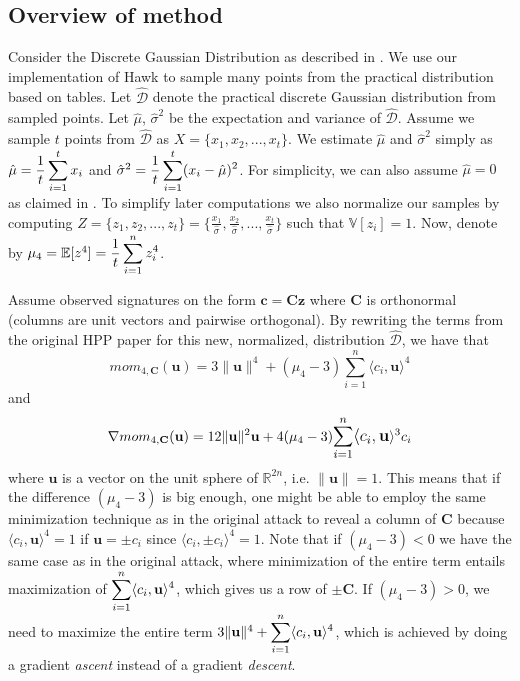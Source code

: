 \documentclass[12 pt]{article}        	%
\newcommand{\mat}[1]{\mathbf{#1}}
\renewcommand{\vec}[1]{\mathbf{#1}}
\newcommand{\bb}[1]{\mathbb{#1}}
\newcommand{\dgdi}{\widehat{\mathcal{D}}}
\begin{document}
\subsection{Overview of method}
Consider the Discrete Gaussian Distribution as described in \cite{HawkSpec24}. We use our implementation of Hawk to sample many points from the practical distribution based on tables.
Let $\dgdi$ denote the practical discrete Gaussian distribution from sampled points.
Let $\hat{\mu}$, $\hat{\sigma}^2$ be the expectation and variance of $\dgdi$.
Assume we sample $t$ points from $\dgdi$ as $X = \{x_1, x_2, ..., x_t\}$. We estimate $\hat{\mu}$ and $\hat{\sigma}^2$ simply as $\hat{\mu} = \mathlarger{\frac{1}{t} \sum_{i=1}^{t} x_i}$ and $\hat{\sigma}^2 = \mathlarger{\frac{1}{t} \sum_{i=1}^{t}(x_i - \hat{\mu})^2}$.
For simplicity, we can also assume $\hat{\mu} = 0$ as claimed in \cite{HawkSpec24}.
To simplify later computations we also normalize our samples by computing $Z = \{z_1, z_2, ..., z_t\} = \{\frac{x_1}{\hat{\sigma}}, \frac{x_2}{\hat{\sigma}},..., \frac{x_t}{\hat{\sigma}}\}$ such that 
$\bb{V}[z_i] = 1$.
Now, denote by $\mu_4 = \bb{E}[z^4] = \mathlarger{\frac{1}{t} \sum_{i=1}^{n} z_i ^4}$. 

Assume observed signatures on the form $\vec{c} = \mat{C} \vec{z}$ where $\mat{C}$ is orthonormal (columns are unit vectors and pairwise orthogonal). 
By rewriting the terms from the original HPP paper \cite{NR09} for this new, normalized, distribution $\dgdi$, we have that
\[mom_{4, \mat{C}} (\vec{u}) = 3 \lVert \vec{u} \rVert ^4 + (\mu_4 - 3) \sum_{i=1}^{n} \langle c_i, \vec{u} \rangle^4 \]
and
\[\nabla mom_{4, \mat{C}} (\vec{u}) = 12 \lVert \vec{u} \rVert^2 \vec{u} + 4(\mu_4 - 3) \mathlarger{\sum_{i=1}^{n} \langle c_i, \vec{u}} \rangle^3 c_i\]
where $\vec{u}$ is a vector on the unit sphere of $\bb{R}^{2n}$, i.e. $\lVert \vec{u} \rVert = 1$.
This means that if the difference $(\mu_4 - 3)$ is big enough, one might be able to employ the same minimization technique as in the original attack to reveal a column of $\mat{C}$ 
because $\langle c_i, \vec{u} \rangle^4 = 1$ if $\vec{u} = \pm c_i$ since $\langle c_i, \pm c_i \rangle^4 = 1$.
Note that if $(\mu_4 - 3) < 0$ we have the same case as in the original attack, where minimization of the entire term entails maximization of $\mathlarger{\sum_{i=1}^{n} \langle c_i, \vec{u} \rangle^4}$, which gives us a row of $\pm \mat{C}$.
If $(\mu_4 - 3) > 0$, we need to maximize the entire term $3 \lVert \vec{u} \rVert ^4 + \mathlarger{\sum_{i=1}^{n} \langle c_i, \vec{u} \rangle^4}$, which is achieved by doing a gradient \textit{ascent} instead of a gradient \textit{descent}.
\end{document}
